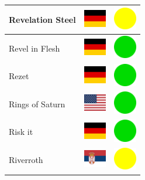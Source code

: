 \documentclass[12pt, a4paper, twoside]{report}
\begin{document}
\begin{center}
\begin{longtable}{|p{5cm}|p{2cm}|p{2cm}|}
			Revelation Steel & \includegraphics[width=1cm]{4x3/de} & \includegraphics[width=1cm]{likes/m} \\ \hline
			Revel in Flesh & \includegraphics[width=1cm]{4x3/de} & \includegraphics[width=1cm]{likes/y} \\ \hline
			Rezet & \includegraphics[width=1cm]{4x3/de} & \includegraphics[width=1cm]{likes/y} \\ \hline
			Rings of Saturn & \includegraphics[width=1cm]{4x3/us} & \includegraphics[width=1cm]{likes/y} \\ \hline
			Risk it & \includegraphics[width=1cm]{4x3/de} & \includegraphics[width=1cm]{likes/y} \\ \hline
			Riverroth & \includegraphics[width=1cm]{4x3/rs} & \includegraphics[width=1cm]{likes/m} \\ \hline

\end{longtable}
\end{center}
\end{document}
